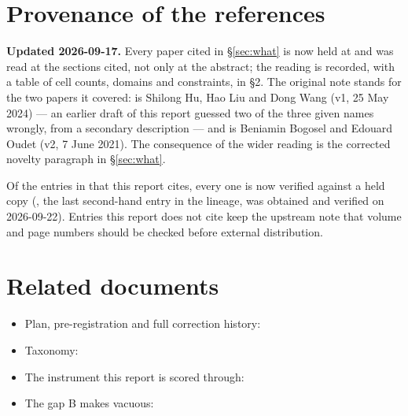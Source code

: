 \documentclass[11pt,a4paper]{article}
\begin{document}
\section*{Provenance of the references}
\textbf{Updated 2026-09-17.} Every paper cited in \S\ref{sec:what} is now held at
 and was read at the sections cited, not only at the
abstract; the reading is recorded, with a table of cell counts, domains and
constraints, in  \S2. The original
note stands for the two papers it covered: \cite{hu2024iterative} is Shilong Hu,
Hao Liu and Dong Wang (v1, 25 May 2024) --- an earlier draft of this report
guessed two of the three given names wrongly, from a secondary description ---
and \cite{bogosel2021longest} is Beniamin Bogosel and Edouard Oudet (v2, 7 June
2021). The consequence of the wider reading is the corrected novelty paragraph in
\S\ref{sec:what}.

Of the entries in  that this report
cites, every one is now verified against a held copy (\cite{ruuth2003volume}, the
last second-hand entry in the lineage, was obtained and verified on
2026-09-22). Entries this report does not cite keep the
upstream note that volume and page numbers should be checked before external
distribution.

\section*{Related documents}
\begin{itemize}\itemsep1pt
\item Plan, pre-registration and full correction history:
\item Taxonomy: 
\item The instrument this report is scored through: 
\item The gap B makes vacuous: 
\end{itemize}



\end{document}
